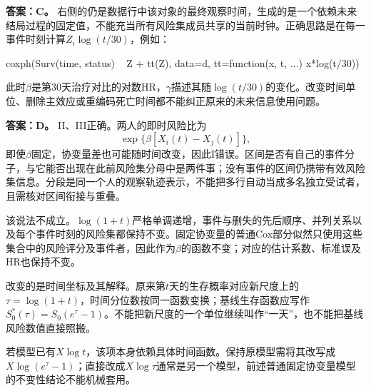 \textbf{答案：C。} 右侧的仍是数据行中该对象的最终观察时间，生成的是一个依赖未来结局过程的固定值，不能充当所有风险集成员共享的当前时钟。正确思路是在每一事件时刻计算$Z_i\log(t/30)$，例如：

\begin{rcode}
coxph(Surv(time, status) ~ Z + tt(Z), data=d,
      tt=function(x, t, ...) x*log(t/30))
\end{rcode}
此时$\beta$是第30天治疗对比的对数HR，$\gamma$描述其随$\log(t/30)$的变化。改变时间单位、删除主效应或重编码死亡时间都不能纠正原来的未来信息使用问题。
\par\nobreak\smallskip{}

\textbf{答案：D。} II、III正确。两人的即时风险比为
\[
\exp\{\beta[X_i(t)-X_j(t)]\},
\]
即使$\beta$固定，协变量差也可能随时间改变，因此I错误。区间是否有自己的事件分子，与它能否出现在此前风险集分母中是两件事；没有事件的区间仍携带有效风险集信息。分段是同一个人的观察轨迹表示，不能把多行自动当成多名独立受试者，且需核对区间衔接与重叠。
\par\nobreak\smallskip{}

该说法不成立。$\log(1+t)$严格单调递增，事件与删失的先后顺序、并列关系以及每个事件时刻的风险集都保持不变。固定协变量的普通Cox部分似然只使用这些集合中的风险评分及事件者，因此作为$\beta$的函数不变；对应的估计系数、标准误及HR也保持不变。

改变的是时间坐标及其解释。原来第$t$天的生存概率对应新尺度上的$\tau=\log(1+t)$，时间分位数按同一函数变换；基线生存函数应写作$S_0^*(\tau)=S_0(e^\tau-1)$。不能把新尺度的一个单位继续叫作“一天”，也不能把基线风险数值直接照搬。

若模型已有$X\log t$，该项本身依赖具体时间函数。保持原模型需将其改写成$X\log(e^\tau-1)$；直接改成$X\log\tau$通常是另一个模型，前述普通固定协变量模型的不变性结论不能机械套用。
\par\nobreak\smallskip{}

